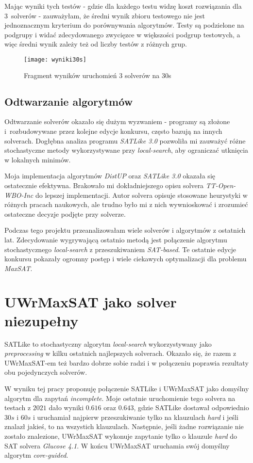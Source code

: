 \documentclass[shortabstract]{iithesis}
\begin{document}
Mając wyniki tych testów - gdzie dla każdego testu widzę koszt rozwiązania dla 3~solverów - zauważyłam, że średni wynik zbioru testowego nie jest jednoznacznym kryterium do porównywania algorytmów. Testy są podzielone na podgrupy i widać zdecydowanego zwycięzce w większości podgrup testowych, a więc średni wynik zależy też od liczby testów z różnych grup.

\begin{figure}[h]
	\texttt{[image: wyniki30s]}
	\caption{Fragment wyników uruchomień 3 solverów na 30s}
\end{figure}

\subsection{Odtwarzanie algorytmów}
Odtwarzanie solverów okazało się dużym wyzwaniem - programy są złożone i~rozbudowywane przez kolejne edycje konkursu, często bazują na innych solverach. Dogłębna analiza programu \textit{SATLike 3.0} pozwoliła mi zauważyć różne stochastyczne metody wykorzystywane przy \textit{local-search}, aby ograniczać utknięcia w lokalnych minimów.

Moja implementacja algorytmów \textit{DistUP} oraz \textit{SATLike 3.0} okazała się ostatecznie efektywna.
Brakowało mi dokładniejszego opisu solvera \textit{TT-Open-WBO-Inc} do lepszej implementacji. Autor solvera opisuje stosowane heurystyki w różnych pracach naukowych, ale trudno było mi z nich wywnioskować i zrozumieć ostateczne decyzje podjęte przy solverze.

Podczas tego projektu przeanalizowałam wiele solverów i algorytmów z ostatnich lat. Zdecydowanie wygrywającą ostatnio metodą jest połączenie algorytmu stochastycznego \textit{local-search} z przeszukiwaniem \textit{SAT-based}. Te ostatnie edycje konkursu pokazały ogromny postęp i wiele ciekawych optymalizacji dla problemu \textit{MaxSAT}.

\section{UWrMaxSAT jako solver niezupełny}
SATLike to stochastyczny algorytm \textit{local-search} wykorzystywany jako \textit{preprocessing} w kilku ostatnich najlepszych solverach. Okazało się, że razem z UWrMaxSAT-em też bardzo dobrze sobie radzi i w połączeniu poprawia rezultaty obu pojedynczych solverów.

W wyniku tej pracy proponuję połączenie SATLike i UWrMaxSAT jako domyślny algorytm dla zapytań \textit{incomplete}. Moje ostatnie uruchomienie tego solvera na testach z $2021$ dało wyniki $0.616$ oraz $0.643$, gdzie SATLike dostawał odpowiednio $30s$ i $60s$ i uruchamiał najpierw przeszukiwanie tylko na klauzulach \textit{hard} i jeśli znalazł jakieś, to na wszystich klauzulach. Następnie, jeśli żadne rozwiązanie nie zostało znalezione, UWrMaxSAT wykonuje zapytanie tylko o klauzule \textit{hard} do SAT solvera \textit{Glucose 4.1}. W końcu UWrMaxSAT uruchamia swój domyślny algorytm \textit{core-guided}.
\end{document}
